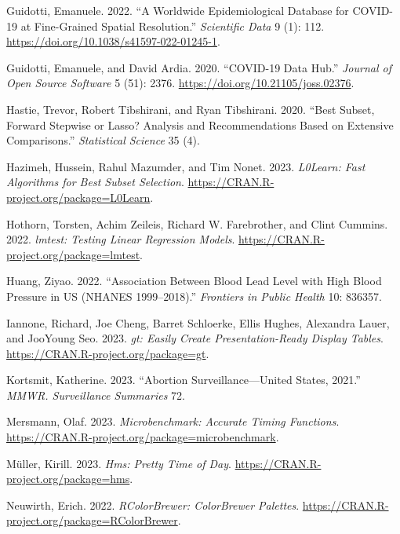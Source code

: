 \documentclass[
  letterpaper,
]{latex/krantz}
\newlength{\cslhangindent}
\newenvironment{CSLReferences}[2] %
 {\begin{list}{}{%
  \setlength{\itemindent}{0pt}
  \setlength{\leftmargin}{0pt}
  \setlength{\parsep}{0pt}
  \ifodd #1
   \setlength{\leftmargin}{\cslhangindent}
   \setlength{\itemindent}{-1\cslhangindent}
  \fi
  \setlength{\itemsep}{#2\baselineskip}}}
 {\end{list}}
\begin{document}
\begin{CSLReferences}{1}{0}
Guidotti, Emanuele. 2022. {``A Worldwide Epidemiological Database for
COVID-19 at Fine-Grained Spatial Resolution.''} \emph{Scientific Data} 9
(1): 112. \url{https://doi.org/10.1038/s41597-022-01245-1}.

Guidotti, Emanuele, and David Ardia. 2020. {``COVID-19 Data Hub.''}
\emph{Journal of Open Source Software} 5 (51): 2376.
\url{https://doi.org/10.21105/joss.02376}.

Hastie, Trevor, Robert Tibshirani, and Ryan Tibshirani. 2020. {``Best
Subset, Forward Stepwise or Lasso? Analysis and Recommendations Based on
Extensive Comparisons.''} \emph{Statistical Science} 35 (4).

Hazimeh, Hussein, Rahul Mazumder, and Tim Nonet. 2023. \emph{L0Learn:
Fast Algorithms for Best Subset Selection}.
\url{https://CRAN.R-project.org/package=L0Learn}.

Hothorn, Torsten, Achim Zeileis, Richard W. Farebrother, and Clint
Cummins. 2022. \emph{{lmtest: Testing Linear Regression Models}}.
\url{https://CRAN.R-project.org/package=lmtest}.

Huang, Ziyao. 2022. {``{Association Between Blood Lead Level with High
Blood Pressure in US (NHANES 1999--2018)}.''} \emph{Frontiers in Public
Health} 10: 836357.

Iannone, Richard, Joe Cheng, Barret Schloerke, Ellis Hughes, Alexandra
Lauer, and JooYoung Seo. 2023. \emph{{gt: Easily Create
Presentation-Ready Display Tables}}.
\url{https://CRAN.R-project.org/package=gt}.

Kortsmit, Katherine. 2023. {``Abortion Surveillance---United States,
2021.''} \emph{MMWR. Surveillance Summaries} 72.

Mersmann, Olaf. 2023. \emph{Microbenchmark: Accurate Timing Functions}.
\url{https://CRAN.R-project.org/package=microbenchmark}.

Müller, Kirill. 2023. \emph{Hms: Pretty Time of Day}.
\url{https://CRAN.R-project.org/package=hms}.

Neuwirth, Erich. 2022. \emph{RColorBrewer: ColorBrewer Palettes}.
\url{https://CRAN.R-project.org/package=RColorBrewer}.


\end{CSLReferences}
\end{document}
